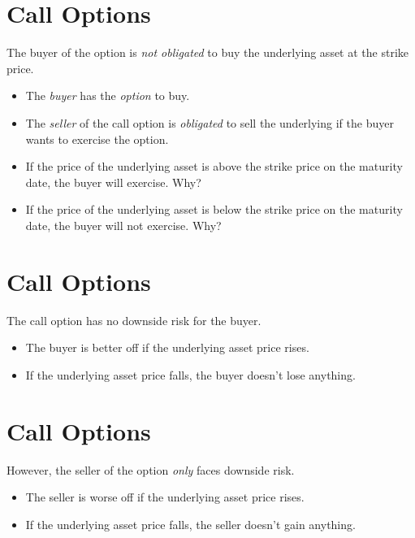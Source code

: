 \documentclass[letterpaper,10pt,english]{sphinxmanual}
\begin{document}
\section{Call Options}
\label{options:id1}
The buyer of the option is \emph{not obligated} to buy the underlying asset
at the strike price.
\begin{itemize}
\item {} 
The \emph{buyer} has the \emph{option} to buy.

\end{itemize}
\begin{itemize}
\item {} 
The \emph{seller} of the call option is \emph{obligated} to sell the
underlying if the buyer wants to exercise the option.

\end{itemize}
\begin{itemize}
\item {} 
If the price of the underlying asset is above the strike price on
the maturity date, the buyer will exercise. Why?

\end{itemize}
\begin{itemize}
\item {} 
If the price of the underlying asset is below the strike price on
the maturity date, the buyer will not exercise. Why?

\end{itemize}


\section{Call Options}
\label{options:id2}
The call option has no downside risk for the buyer.
\begin{itemize}
\item {} 
The buyer is better off if the underlying asset price rises.

\end{itemize}
\begin{itemize}
\item {} 
If the underlying asset price falls, the buyer doesn't lose
anything.

\end{itemize}


\section{Call Options}
\label{options:id3}
However, the seller of the option \emph{only} faces downside risk.
\begin{itemize}
\item {} 
The seller is worse off if the underlying asset price rises.

\end{itemize}
\begin{itemize}
\item {} 
If the underlying asset price falls, the seller doesn't gain
anything.

\end{itemize}
\end{document}

